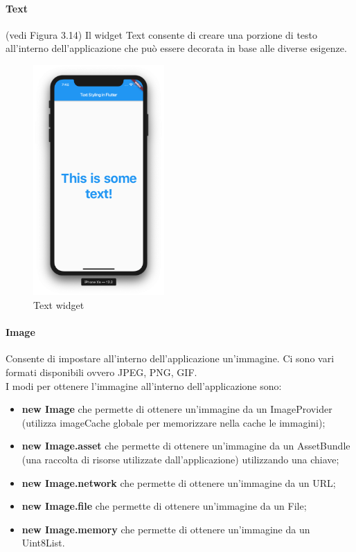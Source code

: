 \paragraph{Text} (vedi Figura 3.14)
Il widget Text consente di creare una porzione di testo all'interno dell'applicazione che può essere decorata in base alle diverse esigenze.
\begin{figure}[htbp]	
	\centering
	\includegraphics[width=5cm]{immagini/text.png}
	\caption{Text widget}
	\label{fig:Text widget}
\end{figure}

\paragraph{Image}
Consente di impostare all'interno dell'applicazione un'immagine.
Ci sono vari formati disponibili ovvero JPEG, PNG, GIF.\\
I modi per ottenere l'immagine all'interno dell'applicazione sono:
\begin{itemize}
	\item \textbf{new Image} che permette di ottenere un'immagine da un  ImageProvider (utilizza imageCache globale per memorizzare nella cache le immagini);   
	\item \textbf{new Image.asset} che permette di ottenere un'immagine da un AssetBundle (una raccolta di risorse utilizzate dall'applicazione) utilizzando una chiave;
	\item \textbf{new Image.network} che permette di ottenere un'immagine da un URL;   
	\item \textbf{new Image.file} che permette di ottenere un'immagine da un File;
	\item \textbf{new Image.memory} che permette di ottenere un'immagine da un Uint8List.
\end{itemize}

